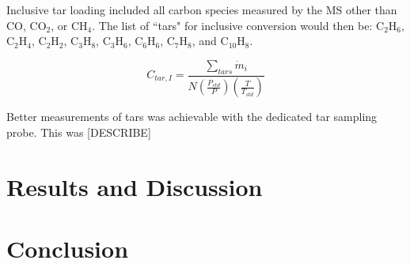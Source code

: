 \documentclass[11pt,twocolumn]{article}
\begin{document}
Inclusive tar loading included all carbon species measured by the MS other than CO, CO$_2$, or CH$_4$.  The list of ``tars" for inclusive conversion would then be: C$_2$H$_6$, C$_2$H$_4$, C$_2$H$_2$, C$_3$H$_8$, C$_3$H$_6$, C$_6$H$_6$, C$_7$H$_8$, and C$_{10}$H$_8$.

\begin{equation}
	C_{tar,I} = \frac{\sum_{tars}\dot{m}_{i}}{N\left(\frac{P_{std}}{P}\right)\left(\frac{T}{T_{std}}\right)}
\end{equation}

Better measurements of tars was achievable with the dedicated tar sampling probe.  This was [DESCRIBE]


\section*{Results and Discussion}



\section*{Conclusion}



\newpage
\appendix
\onecolumn
\end{document}
